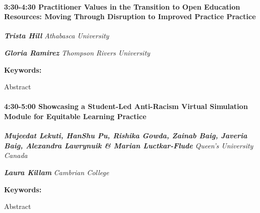 \documentclass[
]{book}
\begin{document}
\begin{session}
\hypertarget{practitioner-values-in-the-transition-to-open-education-resources-moving-through-disruption-to-improved-practice-practice}{%
\paragraph*{\texorpdfstring{3:30-4:30 \textbar{} \textbf{Practitioner
Values in the Transition to Open Education Resources: Moving Through
Disruption to Improved Practice} \textbar{}
Practice}{3:30-4:30 \textbar{} Practitioner Values in the Transition to Open Education Resources: Moving Through Disruption to Improved Practice \textbar{} Practice}}\label{practitioner-values-in-the-transition-to-open-education-resources-moving-through-disruption-to-improved-practice-practice}}

\textbf{\emph{Trista Hill}} \textbar{} \emph{Athabasca University}

\textbf{\emph{Gloria Ramirez}} \textbar{} \emph{Thompson Rivers
University}

\textbf{Keywords:}

Abstract
\end{session}
\begin{session}
\hypertarget{showcasing-a-student-led-anti-racism-virtual-simulation-module-for-equitable-learning-practice}{%
\paragraph*{\texorpdfstring{4:30-5:00 \textbar{} \textbf{Showcasing a
Student-Led Anti-Racism Virtual Simulation Module for Equitable
Learning} \textbar{}
Practice}{4:30-5:00 \textbar{} Showcasing a Student-Led Anti-Racism Virtual Simulation Module for Equitable Learning \textbar{} Practice}}\label{showcasing-a-student-led-anti-racism-virtual-simulation-module-for-equitable-learning-practice}}

\textbf{\emph{Mujeedat Lekuti, HanShu Pu, Rishika Gowda, Zainab Baig,
Javeria Baig, Alexandra Lawrynuik \& Marian Luctkar-Flude}} \textbar{}
\emph{Queen's University Canada}

\textbf{\emph{Laura Killam}} \textbar{} \emph{Cambrian College}

\textbf{Keywords:}

Abstract
\end{session}
\end{document}
